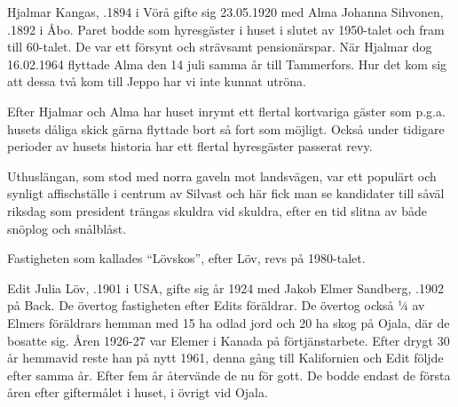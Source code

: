 

Hjalmar Kangas, .1894 i Vörå gifte sig 23.05.1920 med Alma Johanna Sihvonen, .1892 i Åbo. Paret bodde som hyresgäster i huset i slutet av 1950-talet och fram till 60-talet. De var ett försynt och strävsamt pensionärspar. När Hjalmar dog 16.02.1964 flyttade Alma den 14 juli samma år till Tammerfors. Hur det kom sig att dessa två kom till Jeppo har vi inte kunnat utröna.

Efter Hjalmar och Alma har huset inrymt ett flertal kortvariga gäster som p.g.a. husets dåliga skick gärna flyttade bort så fort som möjligt. Också under tidigare perioder av husets historia har ett flertal hyresgäster passerat revy.

Uthuslängan, som stod med norra gaveln mot landsvägen, var ett populärt och synligt affischställe i centrum av Silvast och här fick man se kandidater till såväl riksdag som president trängas skuldra vid skuldra, efter en tid slitna av både snöplog och snålblåst.

Fastigheten som kallades ``Lövskos'', efter Löv, revs på 1980-talet.


Edit Julia Löv, .1901 i USA, gifte sig år 1924 med Jakob Elmer Sandberg, .1902 på Back. De övertog fastigheten efter Edits föräldrar. De övertog också ¼ av Elmers föräldrars hemman med 15 ha odlad jord och 20 ha skog på Ojala, där de bosatte sig. Åren 1926-27 var Elemer i Kanada på förtjänstarbete. Efter drygt 30 år hemmavid reste han på nytt 1961, denna gång till Kalifornien och Edit följde efter samma år. Efter fem år återvände de nu för gott. De bodde endast de första åren efter giftermålet i huset, i övrigt vid Ojala.
\begin{jhchildren}
  \item {}
  \item {}
  \item {}
\end{jhchildren}


